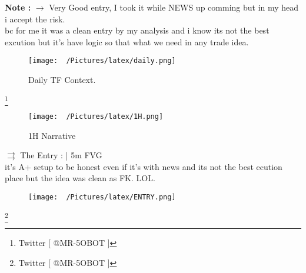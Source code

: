 \documentclass{article}
\begin{document}
\begin{center}
\begin{mdframed}[style=MyQuoteFrame]
  \textbf{Note :} $\rightarrow$ Very Good entry, I took it while NEWS up comming but in my head i accept the risk. \\
  bc for me it was a clean entry by my analysis and i know its not the best excution but it's have logic so that what we need in any trade idea.
\end{mdframed}
\end{center}
\vspace{0.2cm}
\newpage

\centering
\vspace{0.1cm}
\begin{figure}[h!]
\caption{Daily TF Context.}
\begin{adjustbox}{width=1\textwidth,center}
  \texttt{[image: ~/Pictures/latex/daily.png]}
\end{adjustbox}
  \label{fig:image}
\end{figure}


\footnote{Twitter [ @MR-5OBOT ]}

\vspace{0.1cm}
\begin{figure}[h!]
\caption{1H Narrative}
  \begin{adjustbox}{width=1\textwidth,center}
  \texttt{[image: ~/Pictures/latex/1H.png]}
\end{adjustbox}
  \label{fig:image}
\end{figure}

\newpage
\noindent \( \rightrightarrows \) \hspace{0.1cm}The Entry : |  5m FVG \\ \vspace{0.2cm} it's A+ setup to be honest even if it's with news and its not the best ecution place but the idea was clean as FK. LOL.
\begin{figure}[h!]
  \begin{adjustbox}{width=1\textwidth,center}
  \texttt{[image: ~/Pictures/latex/ENTRY.png]}
\end{adjustbox}
\label{fig:image}
\end{figure}
\footnote{Twitter [ @MR-5OBOT ]}
\end{document}
